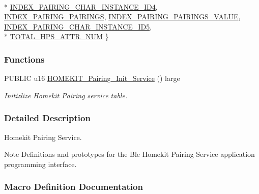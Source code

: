 \begin{DoxyCompactItemize}
\\*
\hyperlink{group___h_p_s_gga0e90329a02e16f5314b1e7c1ba8e141ea344b0967cbed95b36378c760c4904c88}{I\+N\+D\+E\+X\+\_\+\+P\+A\+I\+R\+I\+N\+G\+\_\+\+C\+H\+A\+R\+\_\+\+I\+N\+S\+T\+A\+N\+C\+E\+\_\+\+I\+D4}, 
\hyperlink{group___h_p_s_gga0e90329a02e16f5314b1e7c1ba8e141eab1e51bbec9b22ab91a748674e084062e}{I\+N\+D\+E\+X\+\_\+\+P\+A\+I\+R\+I\+N\+G\+\_\+\+P\+A\+I\+R\+I\+N\+GS}, 
\hyperlink{group___h_p_s_gga0e90329a02e16f5314b1e7c1ba8e141ea0e5873c404bdf18b03489f8ab110c5d8}{I\+N\+D\+E\+X\+\_\+\+P\+A\+I\+R\+I\+N\+G\+\_\+\+P\+A\+I\+R\+I\+N\+G\+S\+\_\+\+V\+A\+L\+UE}, 
\hyperlink{group___h_p_s_gga0e90329a02e16f5314b1e7c1ba8e141eaceec7fb207920ee207b2edfc31c02c3c}{I\+N\+D\+E\+X\+\_\+\+P\+A\+I\+R\+I\+N\+G\+\_\+\+C\+H\+A\+R\+\_\+\+I\+N\+S\+T\+A\+N\+C\+E\+\_\+\+I\+D5}, 
\\*
\hyperlink{group___h_p_s_gga0e90329a02e16f5314b1e7c1ba8e141ea8ec804d03ebaf77f4708eec633a23039}{T\+O\+T\+A\+L\+\_\+\+H\+P\+S\+\_\+\+A\+T\+T\+R\+\_\+\+N\+UM}
 \}
\end{DoxyCompactItemize}
\subsubsection*{Functions}
\begin{DoxyCompactItemize}
\item 
P\+U\+B\+L\+IC u16 \hyperlink{group___h_p_s_ga915616a2c3df3e6158863ba49160d959}{H\+O\+M\+E\+K\+I\+T\+\_\+\+Pairing\+\_\+\+Init\+\_\+\+Service} () large
\begin{DoxyCompactList}\small\item\em Initizlize Homekit Pairing service table. \end{DoxyCompactList}\end{DoxyCompactItemize}


\subsubsection{Detailed Description}
Homekit Pairing Service. 

\begin{DoxyNote}{Note}
Definitions and prototypes for the Ble Homekit Pairing Service application programming interface. 
\end{DoxyNote}


\subsubsection{Macro Definition Documentation}
